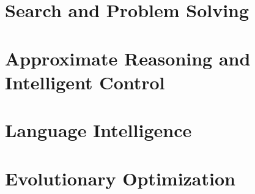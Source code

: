 \documentclass[11pt,oneside,a4paper]{report}
\begin{document}
\hypersetup{pageanchor=false}



\cleardoublepage
{}
\setcounter{tocdepth}{0}
\begingroup
\small
\setlength{\parskip}{0pt}
\tableofcontents
\endgroup
\newpage
\begingroup
\small
\setlength{\parskip}{0pt}
\endgroup
\newpage
\hypersetup{pageanchor=true}



\cleardoublepage
{}

\part{Search and Problem Solving}





\part{Approximate Reasoning and Intelligent Control}



\part{Language Intelligence}



\part{Evolutionary Optimization}


\appendix

\end{document}
